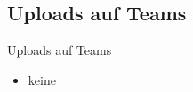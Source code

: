 \subsection{Uploads auf Teams}
\begin{frame}{Uploads auf Teams}
    \begin{itemize}
        \item[\textbullet] keine
    \end{itemize}

\end{frame}




